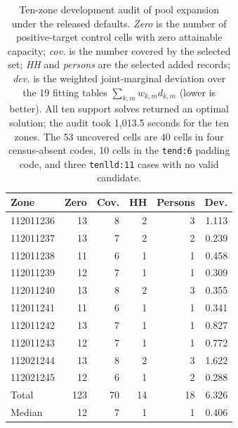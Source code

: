 \begin{table}[h!]
\centering
\caption{Ten-zone development audit of pool expansion under the released
defaults. \emph{Zero} is the number of positive-target control cells with zero
attainable capacity; \emph{cov.} is the number covered by the selected set;
\emph{HH} and \emph{persons} are the selected added records; \emph{dev.} is the
weighted joint-marginal deviation over the 19 fitting tables
$\sum_{k,m}w_{k,m}d_{k,m}$ (lower is better). All ten support solves
returned an optimal solution; the audit took 1{,}013.5 seconds for the ten
zones. The 53 uncovered cells are 40 cells in four census-absent codes, 10
cells in the \texttt{tend:6} padding code, and three \texttt{tenlld:11} cases
with no valid candidate.}
\label{tab:pool_expansion_audit}
\small
\begin{tabular}{@{}lrrrrr@{}}
\toprule
Zone & Zero & Cov. & HH & Persons & Dev. \\
\midrule
112011236 & 13 & 8 & 2 & 3 & 1.113 \\
112011237 & 13 & 7 & 2 & 2 & 0.239 \\
112011238 & 11 & 6 & 1 & 1 & 0.458 \\
112011239 & 12 & 7 & 1 & 1 & 0.309 \\
112011240 & 13 & 8 & 2 & 3 & 0.355 \\
112011241 & 11 & 6 & 1 & 1 & 0.341 \\
112011242 & 13 & 7 & 1 & 1 & 0.827 \\
112011243 & 12 & 7 & 1 & 1 & 0.772 \\
112021244 & 13 & 8 & 2 & 3 & 1.622 \\
112021245 & 12 & 6 & 1 & 2 & 0.288 \\
\midrule
Total  & 123 & 70 & 14 & 18 & 6.326 \\
Median & 12  & 7  & 1  & 1  & 0.406 \\
\bottomrule
\end{tabular}
\end{table}

